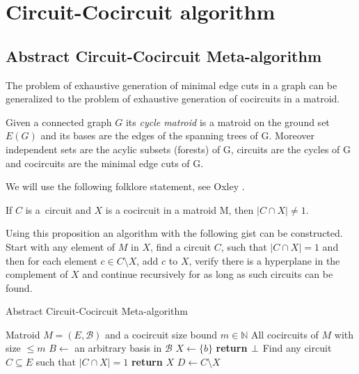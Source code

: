 \chapter{Circuit-Cocircuit algorithm}
\label{ch:algorithm}

\section{Abstract Circuit-Cocircuit Meta-algorithm}

The problem of exhaustive generation of minimal edge cuts in \linebreak a graph can be generalized to the problem of exhaustive generation of cocircuits in a matroid.

\begin{defn}
	\label{defn:cycle_matroid}
	Given a connected graph $G$ its \textit{cycle matroid} is a matroid on the ground set $E(G)$ and its bases are the edges of the spanning trees of G. Moreover independent sets are the acylic subsets (forests) of G, circuits are the cycles of G and cocircuits are the minimal edge cuts of G.
\end{defn}

We will use the following folklore statement, see Oxley \cite{oxley2006matroid}.

\begin{prop}
	\label{prop_circuit-cocircuit}
	If $C$ is a~circuit and $X$ is a cocircuit in a matroid M, then ${\lvert C \cap X \rvert \neq 1}$.
\end{prop}

Using this proposition an algorithm with the following gist can be constructed. Start with any element of $M$ in $X$, find a circuit $C$, such that \linebreak ${\lvert C \cap X \rvert = 1}$ and then for each element $c \in C \setminus X$, add $c$ to $X$, verify there is a hyperplane in the complement of $X$ and continue recursively for as long as such circuits can be found.

\clearpage

\begin{algorithm}
	\caption{Abstract Circuit-Cocircuit Meta-algorithm}
	\label{alg:meta}
\begin{algorithmic}[1]
	\Require Matroid $M = (E, \mathcal{B})$ and a cocircuit size bound $m \in \mathbb{N}$
	\Ensure All cocircuits of $M$ with size $\leq m$
	\State $B \leftarrow$ an arbitrary basis in $\mathcal{B}$
		\State $X \leftarrow \{b\}$
		\State {}
	\EndFor
		\State \textbf{return $\perp$}
	\EndIf
	\State Find any circuit $C \subseteq E$ such that $\lvert C \cap X \rvert = 1$
		\State \textbf{return} $X$ 
	\Else
		\State $D \leftarrow C \setminus X$
			\State {}
		\EndFor
	\EndIf

	\EndProcedure
\end{algorithmic}
\end{algorithm}


